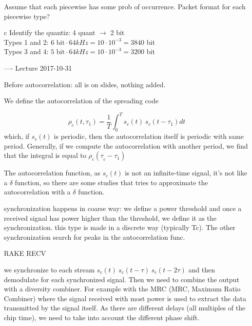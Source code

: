 \begin{exercize}{3}
\begin{itemize}
               Assume that each piecewise has some prob of occurrence. Packet format for each piecewise type?\\
            \begin{solution}{c}
              Identify the quantiz: 4 quant $\rightarrow$ 2 bit\\
              Types 1 and 2: $6 \textrm{ bit} \cdot 64 kHz = 10 \cdot 10^{-3} = 3840$ bit\\
              Types 3 and 4: $5 \textrm{ bit} \cdot 64 kHz = 10 \cdot 10^{-3} = 3200$ bit\\
            \end{solution}
          \end{itemize}
\end{exercize}

----
Lecture 2017-10-31

Before autocorrelation: all is on slides, nothing added.

We define the autocorrelation of the spreading code

\begin{equation}
  \rho_c (t,\tau_1) = \frac{1}{T}\int_{0}^{T} s_c(t) ~ s_c(t-\tau_1) dt
\end{equation}
which, if $s_c(t)$ is periodic, then the autocorrelation itself is periodic with same period. Generally, if we compute the autocorrelation with another period, we find that the integral is equal to $\rho_c(\tau_{_0}-\tau_1)$

The autocorrelation function, as $s_c(t)$ is not an infinite-time signal, it's not like a $\delta$ function, so there are some studies that tries to approximate the autocorrelation with a $\delta$ function.

synchronization happens in coarse way: we define a power threshold and once a received signal has power higher than the threshold, we define it as the synchronization. this type is made in a discrete way (typically Tc). The other synchronization search for peaks in the autocorrelation func.

RAKE RECV

we synchronize to each stream $s_c(t) ~ s_c(t-\tau)~ s_c(t-2\tau)$ and then demodulate for each synchronized signal. Then we need to combine the output with a diversity combiner. For example with the MRC (MRC, Maximum Ratio Combiner) where the signal received with most power is used to extract the data transmitted by the signal itself. As there are different delays (all multiples of the chip time), we need to take into account the different phase shift.

